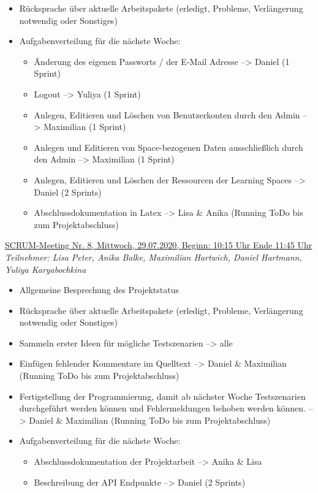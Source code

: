 \documentclass[a4paper,report,headsepline]{scrreprt}
\begin{document}
\begin{itemize}
\item Rücksprache über aktuelle Arbeitspakete (erledigt, Probleme, Verlängerung notwendig oder Sonstiges)
\item Aufgabenverteilung für die nächste Woche:
\begin{itemize}
\item Änderung des eigenen Passworts / der E-Mail Adresse --> Daniel (1 Sprint)
\item Logout --> Yuliya (1 Sprint)
\item Anlegen, Editieren und Löschen von Benutzerkonten durch den Admin --> Maximilian (1 Sprint)
\item Anlegen und Editieren von Space-bezogenen Daten ausschließlich durch den Admin --> Maximilian (1 Sprint)
\item Anlegen, Editieren und Löschen der Ressourcen der Learning Spaces --> Daniel (2 Sprints)
\item Abschlussdokumentation in Latex --> Lisa \& Anika (Running ToDo bis zum Projektabschluss)

\end{itemize}
\end{itemize}
 \underline{{\large SCRUM-Meeting Nr. 8, Mittwoch, 29.07.2020, Beginn: 10:15 Uhr Ende 11:45 Uhr}}  \\
\textit{Teilnehmer: Lisa Peter, Anika Balke, Maximilian Hartwich, Daniel Hartmann, Yuliya Karyabochkina}
\begin{itemize}
\item Allgemeine Besprechung des Projektstatus
\item Rücksprache über aktuelle Arbeitspakete (erledigt, Probleme, Verlängerung notwendig oder Sonstiges)
\item Sammeln erster Ideen für mögliche Testszenarien --> alle
\item Einfügen fehlender Kommentare im Quelltext --> Daniel \& Maximilian (Running ToDo bis zum Projektabschluss)
\item Fertigstellung der Programmierung, damit ab nächster Woche Testszenarien durchgeführt werden können und Fehlermeldungen behoben werden können. --> Daniel \& Maximilian (Running ToDo bis zum Projektabschluss)
\item Aufgabenverteilung für die nächste Woche:
\begin{itemize}
\item Abschlussdokumentation der Projektarbeit --> Anika \& Lisa
\item Beschreibung der API Endpunkte --> Daniel (2 Sprints)

\end{itemize}
\end{itemize}
\end{document}
